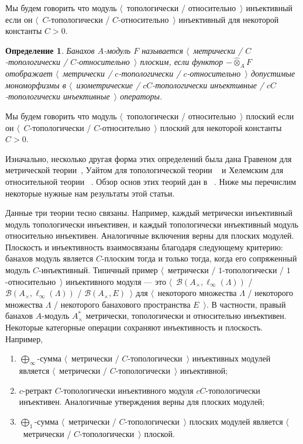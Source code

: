 \documentclass[12pt]{article}
\newtheorem{definition}[theorem]{Определение}
\newcommand{\projtens}{\mathbin{\widehat{\otimes}}}
\begin{document}
Мы будем говорить что модуль $\langle$~топологически / относительно~$\rangle$
инъективный если он $\langle$~$C$-топологически / $C$-относительно~$\rangle$
инъективный для некоторой константы $C>0$.

\begin{definition} Банахов $A$-модуль $F$ называется \emph{$\langle$~метрически
/ $C$-топологически / $C$-относительно~$\rangle$ плоским}, если функтор
$-\projtens_A F$ отображает $\langle$~метрически / $c$-топологически /
$c$-относительно~$\rangle$ допустимые мономорфизмы в $\langle$~изометрические /
$cC$-топологически инъективные / $cC$-топологически инъективные~$\rangle$
операторы.
\end{definition}

Мы будем говорить что модуль $\langle$~топологически / относительно~$\rangle$
плоский если он $\langle$~$C$-топологически / $C$-относительно~$\rangle$ плоский
для некоторой константы $C>0$.

Изначально, несколько другая форма этих определений была дана Гравеном для
метрической теории~\cite{GravInjProjBanMod}, Уайтом для топологической теории
~\cite{WhiteInjmoduAlg} и Хелемским для относительной теории
~\cite{HelemHomolDimNorModBanAlg}. Обзор основ этих теорий дан в
~\cite{NemGeomProjInjFlatBanMod}. Ниже мы перечислим некоторые нужные нам
результаты этой статьи.

Данные три теории тесно связаны. Например, каждый метрически инъективный модуль
топологически инъективен, и каждый топологически инъективный модуль относительно
инъективен. Аналогичные включения верны для плоских модулей. Плоскость и
инъективность взаимосвязаны благодаря следующему критерию: банахов модуль
является $C$-плоским тогда и только тогда, когда его сопряженный модуль
$C$-инъективный. Типичный пример $\langle$~метрически / $1$-топологически /
$1$-относительно~$\rangle$ инъективного модуля --- это
$\langle$~$\mathcal{B}(A_\times, \ell_\infty(\Lambda))$ / $\mathcal{B}(A_\times,
\ell_\infty(\Lambda))$ / $\mathcal{B}(A_\times, E)$~$\rangle$ для
$\langle$~некоторого множества $\Lambda$ / некоторого множества $\Lambda$ /
некоторого банахового пространства $E$~$\rangle$. В частности, правый банахов
$A$-модуль $A_\times^*$ метрически, топологически и относительно инъективен.
Некоторые категорные операции сохраняют инъективность и плоскость. Например, 
\begin{enumerate}[label = (\roman*)]
\item $\bigoplus_\infty$-сумма $\langle$~метрически /
$C$-топологически~$\rangle$ инъективных модулей является $\langle$~метрически /
$C$-топологически~$\rangle$ инъективной;

\item $c$-ретракт $C$-топологически инъективного модуля $cC$-топологически
инъективен. Аналогичные утверждения верны для плоских модулей;

\item $\bigoplus_1$-сумма $\langle$~метрически / $C$-топологически~$\rangle$
плоских модулей является $\langle$~метрически / $C$-топологически~$\rangle$
плоской.
\end{enumerate}
\end{document}
